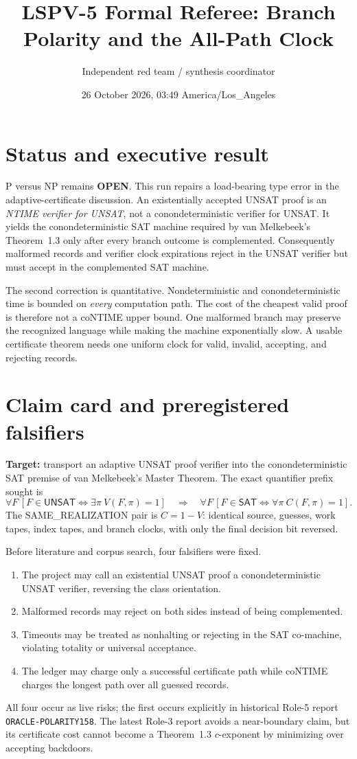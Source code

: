 \documentclass[11pt]{article}
\title{LSPV-5 Formal Referee: Branch Polarity and the All-Path Clock}
\author{Independent red team / synthesis coordinator}
\date{26 October 2026, 03:49 America/Los\_Angeles}
\newcommand{\status}[1]{\textbf{#1}}
\newcommand{\SAT}{\mathsf{SAT}}
\newcommand{\UNSAT}{\mathsf{UNSAT}}
\begin{document}
\maketitle

\section*{Status and executive result}
P versus NP remains \status{OPEN}.  This run repairs a load-bearing type error
in the adaptive-certificate discussion.  An existentially accepted UNSAT
proof is an \emph{NTIME verifier for UNSAT}, not a conondeterministic verifier
for UNSAT.  It yields the conondeterministic SAT machine required by van
Melkebeek's Theorem~1.3 only after every branch outcome is complemented.
Consequently malformed records and verifier clock expirations reject in the
UNSAT verifier but must accept in the complemented SAT machine.

The second correction is quantitative.  Nondeterministic and
conondeterministic time is bounded on \emph{every} computation path.  The
cost of the cheapest valid proof is therefore not a coNTIME upper bound.
One malformed branch may preserve the recognized language while making the
machine exponentially slow.  A usable certificate theorem needs one uniform
clock for valid, invalid, accepting, and rejecting records.

\section*{Claim card and preregistered falsifiers}
\textbf{Target:} transport an adaptive UNSAT proof verifier into the
conondeterministic SAT premise of van Melkebeek's Master Theorem.  The exact
quantifier prefix sought is
\[
 \forall F\,[F\in\UNSAT\iff\exists\pi\ V(F,\pi)=1]
 \quad\Longrightarrow\quad
 \forall F\,[F\in\SAT\iff\forall\pi\ C(F,\pi)=1].
\]
The SAME\_REALIZATION pair is $C=1-V$: identical source, guesses, work tapes,
index tapes, and branch clocks, with only the final decision bit reversed.

Before literature and corpus search, four falsifiers were fixed.
\begin{enumerate}
\item The project may call an existential UNSAT proof a conondeterministic
      UNSAT verifier, reversing the class orientation.
\item Malformed records may reject on both sides instead of being complemented.
\item Timeouts may be treated as nonhalting or rejecting in the SAT co-machine,
      violating totality or universal acceptance.
\item The ledger may charge only a successful certificate path while coNTIME
      charges the longest path over all guessed records.
\end{enumerate}
All four occur as live risks; the first occurs explicitly in historical Role-5
report \texttt{ORACLE-POLARITY158}.  The latest Role-3 report avoids a
near-boundary claim, but its certificate cost cannot become a Theorem~1.3
$c$-exponent by minimizing over accepting backdoors.
\end{document}
